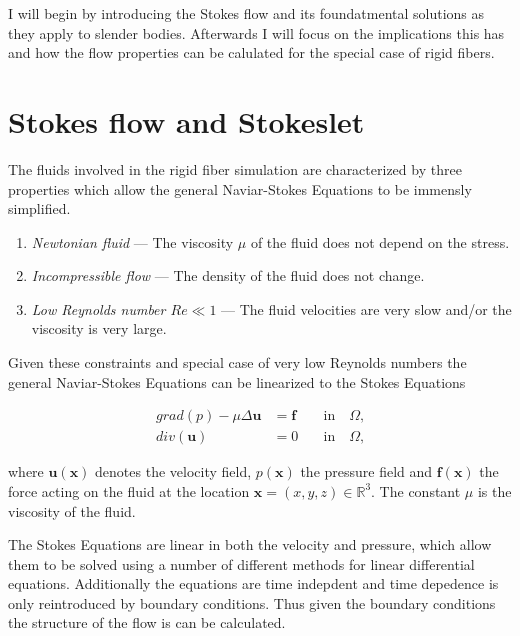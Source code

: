 \documentclass[a4paper,11pt]{kth-mag}
\begin{document}
I will begin by introducing the Stokes flow and its foundatmental solutions as they apply to slender bodies. Afterwards I will focus on the implications this has and how the flow properties can be calulated for the special case of rigid fibers.

\section{Stokes flow and Stokeslet}
The fluids involved in the rigid fiber simulation are characterized by three properties which allow the general Naviar-Stokes Equations to be immensly simplified.
\begin{enumerate}
  \item{\textit{Newtonian fluid} — The viscosity $\mu$ of the fluid does not depend on the stress.}
  \item{\textit{Incompressible flow} — The density of the fluid does not change.}
  \item{\textit{Low Reynolds number $Re \ll 1$} — The fluid velocities are very slow and/or the viscosity is very large.}
\end{enumerate}

Given these constraints and special case of very low Reynolds numbers the general Naviar-Stokes Equations can be linearized to the Stokes Equations

\begin{equation}
\label{eq:stokes_equations}
\begin{aligned}
    grad(p) - \mu \Delta \mathbf{u} &= \mathbf{f} \quad &\text{in} \quad \Omega \text{,}\\
    div(\mathbf{u}) &= 0 \quad &\text{in} \quad \Omega \text{,}
\end{aligned}
\end{equation}

where $\mathbf{u}(\mathbf{x})$ denotes the velocity field, $p(\mathbf{x})$ the pressure field and $\mathbf{f}(\mathbf{x})$ the force acting on the fluid at the location $\mathbf{x} = (x,y,z) \in \mathbb{R}^3$.
The constant $\mu$ is the viscosity of the fluid.

The Stokes Equations are linear in both the velocity and pressure, which allow them to be solved using a number of different methods for linear differential equations. Additionally the equations are time indepdent and time depedence is only reintroduced by boundary conditions. Thus given the boundary conditions the structure of the flow is can be calculated.
\end{document}
